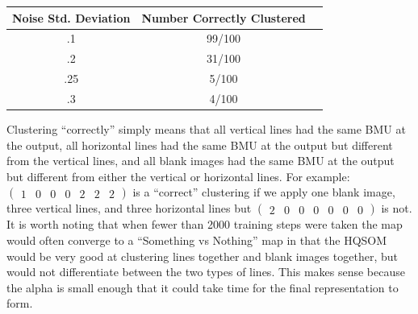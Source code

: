 \documentclass[a4paper,10pt]{article}
\begin{document}
\begin{center}
  \begin{tabular}{ | c | c | c | }
    \hline
    Noise Std. Deviation & Number Correctly Clustered\\ \hline
    .1 & 99/100 \\ \hline
    .2 & 31/100 \\ \hline
    .25 & 5/100 \\ \hline
    .3 &  4/100\\
    \hline
  \end{tabular}
\label{table:3TestResults}
\end{center}
Clustering ``correctly'' simply means that all vertical lines had the same BMU at the output, all
horizontal lines had the same BMU at the output but different from the vertical lines, and all
blank images had the same BMU at the output but different from either the vertical or horizontal
lines.  For example: $ \begin{pmatrix} 1 & 0 & 0 & 0 & 2 & 2 & 2 \end{pmatrix}$ is a ``correct''
clustering if we apply one blank image, three vertical lines, and three horizontal lines but $
\begin{pmatrix}  2 & 0 & 0 & 0 & 0 & 0 & 0 \end{pmatrix}$ is not. It is worth noting that when fewer
than 2000 training steps were taken the map would often converge to a ``Something vs Nothing'' map
in that the HQSOM would be very good at clustering lines together and blank images together, but
would not differentiate between the two types of lines.  This makes sense because the alpha is
small enough that it could take time for the final representation to form.
\end{document}
